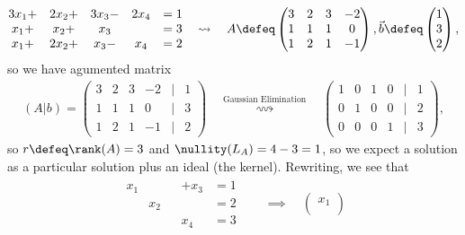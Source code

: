 \begin{example}
    \begin{align*}
        \begin{matrix}
            3x_1 + &2x_2 + &3x_3 - &2 x_4 &= 1\\
            x_1 + &x_2 + &x_3& &= 3\\
            x_1 + &2x_2 + &x_3 - &x_4 &= 2
        \end{matrix} 
        \quad \rightsquigarrow \quad A \defeq \begin{pmatrix}
            3 & 2 & 3 & -2\\
            1 & 1 & 1 & 0\\
            1 & 2 & 1 & -1
        \end{pmatrix}, \vec{b} \defeq \begin{pmatrix}
            1\\
            3\\
            2
        \end{pmatrix},
    \end{align*}
    so we have agumented matrix \begin{align*}
        (A \vert b) = \begin{pmatrix}
            3 & 2 & 3 & -2 & \vert &1 \\
            1 & 1 & 1 & 0 &\vert &3\\
            1 & 2 & 1 & -1 & \vert& 2
        \end{pmatrix} \quad \overset{\text{Gaussian Elimination}}{\rightsquigarrow} \quad \begin{pmatrix}
            1 & 0 & 1 & 0 & \vert &1\\
            0 & 1 & 0 & 0 & \vert & 2\\
            0 & 0 & 0 & 1 & \vert &3
        \end{pmatrix},
    \end{align*}
    so $r \defeq \rank (A) = 3$ and $\nullity(L_A) = 4 - 3 = 1$, so we expect a solution as a particular solution plus an ideal (the kernel). Rewriting, we see that \begin{align*}
        \begin{matrix}
            x_1  & & &+x_3 &= 1\\
            & x_2 & & &= 2\\
            & & & x_4 &= 3
        \end{matrix} \quad &\implies \quad \begin{pmatrix}
            x_1\\

\end{pmatrix}
\end{align*}
\end{example}
